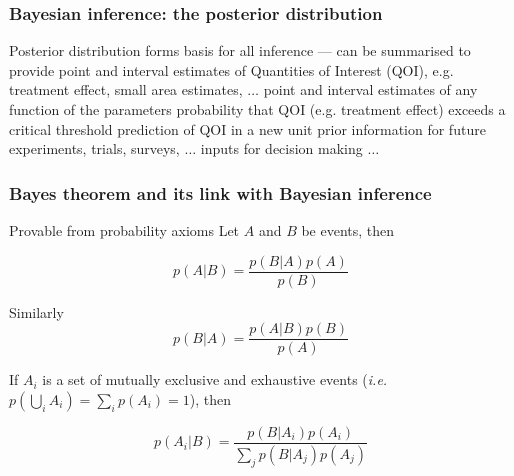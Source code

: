 
\begin{frame}[t]

\frametitle{Bayesian inference: the posterior distribution}

Posterior distribution forms basis for all inference --- can
be summarised to provide\vspace{2mm}
\bibig
\I point and interval estimates of Quantities of Interest (QOI), e.g. treatment effect, small area estimates, $\hdots$\vspace{2mm}
\I point and interval estimates of any function of the parameters\vspace{2mm}
\I probability that QOI (e.g. treatment effect) exceeds a critical threshold\vspace{2mm}
\I prediction of QOI in a new unit\vspace{2mm}
\I prior information for future experiments, trials, surveys, $\hdots$\vspace{2mm}
\I inputs for decision making\vspace{2mm}
\I $\hdots$
\eibig
\end{frame}


\begin{frame}[t]

\frametitle{Bayes theorem and its link with Bayesian inference}


\bi
\I Provable from probability axioms\vspace{2mm}
\I Let $A$ and $B$ be events, then

$$ p(A|B) = \frac{ p(B|A) p(A) } {p(B)}$$\vspace{1mm}

\I Similarly 
$$ p(B|A) = \frac{ p(A| B) p(B)}{p(A)}$$ \vspace{1mm}

\I If $A_i$ is a set of mutually exclusive and exhaustive events
({\it i.e.} $ p( \bigcup\limits_i A_i ) = \sum\limits_i p(A_i) = 1 $), then

$$ p(A_i|B) = \frac{ p(B|A_i) p(A_i) } {\sum\limits_j p(B|A_j) p(A_j) }$$
\ei
\end{frame}



